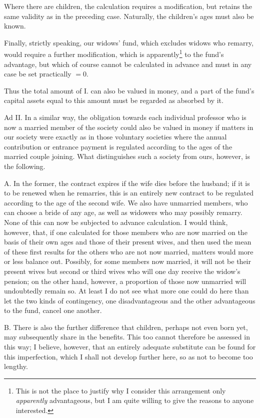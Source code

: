 Where there are children, the calculation requires a modification, but retains the same validity as in the preceding case. Naturally, the children's ages must also be known.

Finally, strictly speaking, our widows' fund, which excludes widows who remarry, would require a further modification, which is apparently\footnote{This is not the place to justify why I consider this arrangement only \textit{apparently} advantageous, but I am quite willing to give the reasons to anyone interested.} to the fund's advantage, but which of course cannot be calculated in advance and must in any case be set practically \(=0\).

Thus the total amount of I. can also be valued in money, and a part of the fund's capital assets equal to this amount must be regarded as absorbed by it.

Ad II. In a similar way, the obligation towards each individual professor who is now a married member of the society could also be valued in money if matters in our society were exactly as in those voluntary societies where the annual contribution or entrance payment is regulated according to the ages of the married couple joining. What distinguishes such a society from ours, however, is the following.

A. In the former, the contract expires if the wife dies before the husband; if it is to be renewed when he remarries, this is an entirely new contract to be regulated according to the age of the second wife. We also have unmarried members, who can choose a bride of any age, as well as widowers who may possibly remarry. None of this can now be subjected to advance calculation. I would think, however, that, if one calculated for those members who are now married on the basis of their own ages and those of their present wives, and then used the mean of these first results for the others who are not now married, matters would more or less balance out. Possibly, for some members now married, it will not be their present wives but second or third wives who will one day receive the widow's pension; on the other hand, however, a proportion of those now unmarried will undoubtedly remain so. At least I do not see what more one could do here than let the two kinds of contingency, one disadvantageous and the other advantageous to the fund, cancel one another.

B. There is also the further difference that children, perhaps not even born yet, may subsequently share in the benefits. This too cannot therefore be assessed in this way; I believe, however, that an entirely adequate substitute can be found for this imperfection, which I shall not develop further here, so as not to become too lengthy.


